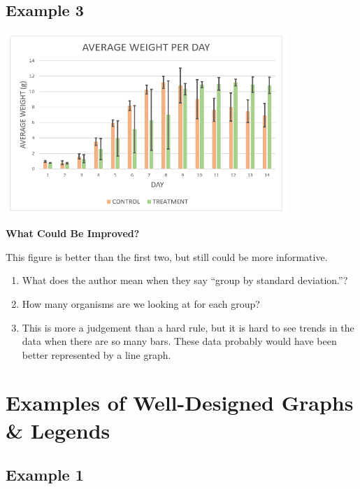 \documentclass[
]{book}
\providecommand{\tightlist}{%
  \setlength{\itemsep}{0pt}\setlength{\parskip}{0pt}}
\begin{document}
\hypertarget{example-3-7}{%
\subsection{Example 3}\label{example-3-7}}

\includegraphics[width=0.8\textwidth,height=\textheight]{images/Average_weight.png}

\textbf{What Could Be Improved?}

This figure is better than the first two, but still could be more informative.

\begin{enumerate}
\def\labelenumi{\arabic{enumi}.}
\tightlist
\item
  What does the author mean when they say ``group by standard deviation.''?
\item
  How many organisms are we looking at for each group?
\item
  This is more a judgement than a hard rule, but it is hard to see trends in the data when there are so many bars. These data probably would have been better represented by a line graph.
\end{enumerate}

\hypertarget{examples-of-well-designed-graphs-legends}{%
\section{Examples of Well-Designed Graphs \& Legends}\label{examples-of-well-designed-graphs-legends}}

\hypertarget{example-1-11}{%
\subsection{Example 1}\label{example-1-11}}
\end{document}
